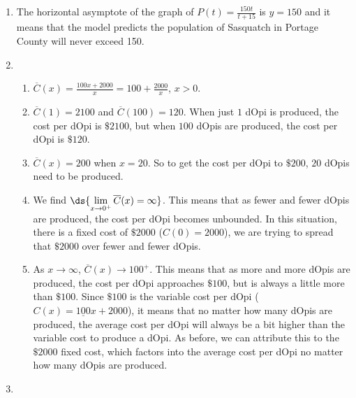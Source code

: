 \documentclass{ximera}
\begin{document}
\begin{enumerate}
\begin{enumerate}
\end{enumerate}

\item The horizontal asymptote of the graph of $P(t) = \frac{150t}{t + 15}$ is $y = 150$ and it means that the model predicts the population of Sasquatch in Portage County will never exceed 150.

\item  \begin{enumerate}

\item $\overline{C}(x) = \frac{100x+2000}{x} = 100 + \frac{2000}{x}$, $x > 0$.

\item  $\overline{C}(1) = 2100$ and $\overline{C}(100) = 120$. When just $1$ dOpi is produced, the cost per dOpi is $\$2100$, but when $100$ dOpis are produced, the cost per dOpi is $\$120$.

\item  $\overline{C}(x) = 200$ when $x = 20$.  So to get the cost per dOpi to $\$200$, $20$ dOpis need to be produced.

\item  We find $\ds{\lim_{x \rightarrow 0^{+}} \overline{C}(x) = \infty}$.  This means that as fewer and fewer dOpis are produced, the cost per dOpi becomes unbounded.  In this situation, there is a fixed cost of $\$2000$ ($C(0) = 2000$), we are trying to spread that $\$2000$ over fewer and fewer dOpis.

\item   As $x \rightarrow \infty$,  $\overline{C}(x) \rightarrow 100^{+}$.  This means that as more and more dOpis are produced, the cost per dOpi approaches $\$100$, but is always a little more than $\$100$.  Since $\$100$ is the variable cost per dOpi ($C(x) = \underline{100}x+2000$), it means that no matter how many dOpis are produced, the average cost per dOpi will always be a bit higher than the variable cost to produce a dOpi.  As before, we can attribute this to the $\$2000$ fixed cost, which factors into the average cost per dOpi no matter how many dOpis are produced.

\end{enumerate}

\item  \begin{enumerate}


\end{enumerate}
\end{enumerate}
\end{document}
